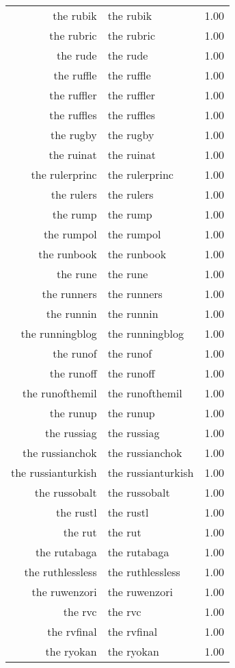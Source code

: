 \begin{table}[ht]
\begin{tabular}{rlr}
  the rubik & the rubik & 1.00 \\ 
  the rubric & the rubric & 1.00 \\ 
  the rude & the rude & 1.00 \\ 
  the ruffle & the ruffle & 1.00 \\ 
  the ruffler & the ruffler & 1.00 \\ 
  the ruffles & the ruffles & 1.00 \\ 
  the rugby & the rugby & 1.00 \\ 
  the ruinat & the ruinat & 1.00 \\ 
  the rulerprinc & the rulerprinc & 1.00 \\ 
  the rulers & the rulers & 1.00 \\ 
  the rump & the rump & 1.00 \\ 
  the rumpol & the rumpol & 1.00 \\ 
  the runbook & the runbook & 1.00 \\ 
  the rune & the rune & 1.00 \\ 
  the runners & the runners & 1.00 \\ 
  the runnin & the runnin & 1.00 \\ 
  the runningblog & the runningblog & 1.00 \\ 
  the runof & the runof & 1.00 \\ 
  the runoff & the runoff & 1.00 \\ 
  the runofthemil & the runofthemil & 1.00 \\ 
  the runup & the runup & 1.00 \\ 
  the russiag & the russiag & 1.00 \\ 
  the russianchok & the russianchok & 1.00 \\ 
  the russianturkish & the russianturkish & 1.00 \\ 
  the russobalt & the russobalt & 1.00 \\ 
  the rustl & the rustl & 1.00 \\ 
  the rut & the rut & 1.00 \\ 
  the rutabaga & the rutabaga & 1.00 \\ 
  the ruthlessless & the ruthlessless & 1.00 \\ 
  the ruwenzori & the ruwenzori & 1.00 \\ 
  the rvc & the rvc & 1.00 \\ 
  the rvfinal & the rvfinal & 1.00 \\ 
  the ryokan & the ryokan & 1.00 \\ 

\end{tabular}
\end{table}
